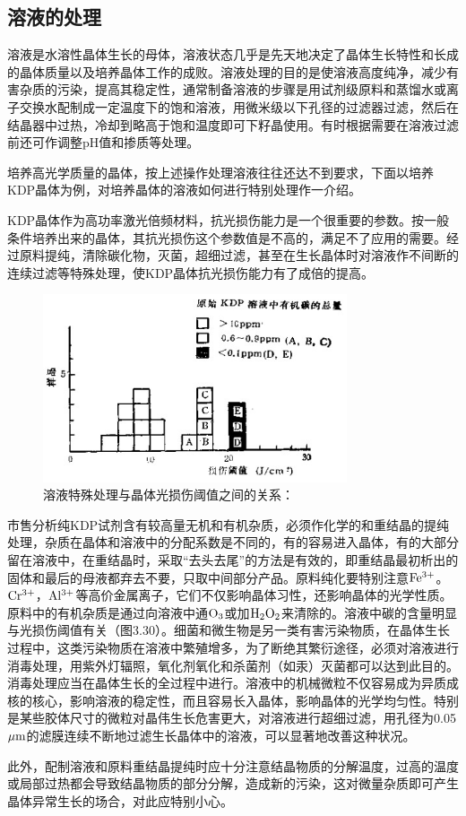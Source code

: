 \subsection{溶液的处理}
溶液是水溶性晶体生长的母体，溶液状态几乎是先天地决定了晶体生长特性和长成的晶体质量以及培养晶体工作的成败。溶液处理的目的是使溶液高度纯净，减少有害杂质的污染，提高其稳定性，通常制备溶液的步骤是用试剂级原料和蒸馏水或离子交换水配制成一定温度下的饱和溶液，用微米级以下孔径的过滤器过滤，然后在结晶器中过热，冷却到略高于饱和温度即可下籽晶使用。有时根据需要在溶液过滤前还可作调整pH值和掺质等处理。

培养高光学质量的晶体，按上述操作处理溶液往往还达不到要求，下面以培养KDP晶体为例，对培养晶体的溶液如何进行特别处理作一介绍。

KDP晶体作为高功率激光倍频材料，抗光损伤能力是一个很重要的参数。按一般条件培养出来的晶体，其抗光损伤这个参数值是不高的，满足不了应用的需要。经过原料提纯，清除碳化物，灭菌，超细过滤，甚至在生长晶体时对溶液作不间断的连续过滤等特殊处理，使KDP晶体抗光损伤能力有了成倍的提高。

\begin{figure}[htbp]
 \centering
 \includegraphics[width=0.8\textwidth]{fig/cp03/img3.30.jpg}
 \caption{溶液特殊处理与晶体光损伤阈值之间的关系：}
\end{figure}

市售分析纯KDP试剂含有较高量无机和有机杂质，必须作化学的和重结晶的提纯处理，杂质在晶体和溶液中的分配系数是不同的，有的容易进入晶体，有的大部分留在溶液中，在重结晶时，采取“去头去尾”的方法是有效的，即重结晶最初析出的固体和最后的母液都弃去不要，只取中间部分产品。原料纯化要特别注意$\rm Fe^{3+}$。$\rm Cr^{3+}$，$\rm Al^{3+}$等高价金属离子，它们不仅影响晶体习性，还影响晶体的光学性质。原料中的有机杂质是通过向溶液中通$\rm O_3$或加$\rm H_2O_2$来清除的。溶液中碳的含量明显与光损伤阈值有关（图3.30）。细菌和微生物是另一类有害污染物质，在晶体生长过程中，这类污染物质在溶液中繁殖增多，为了断绝其繁衍途径，必须对溶液进行消毒处理，用紫外灯辐照，氧化剂氧化和杀菌剂（如汞）灭菌都可以达到此目的。消毒处理应当在晶体生长的全过程中进行。溶液中的机械微粒不仅容易成为异质成核的核心，影响溶液的稳定性，而且容易长入晶体，影响晶体的光学均匀性。特别是某些胶体尺寸的微粒对晶伟生长危害更大，对溶液进行超细过滤，用孔径为0.05$\rm\mu m$的滤膜连续不断地过滤生长晶体中的溶液，可以显著地改善这种状况。

此外，配制溶液和原料重结晶提纯时应十分注意结晶物质的分解温度，过高的温度或局部过热都会导致结晶物质的部分分解，造成新的污染，这对微量杂质即可产生晶体异常生长的场合，对此应特别小心。